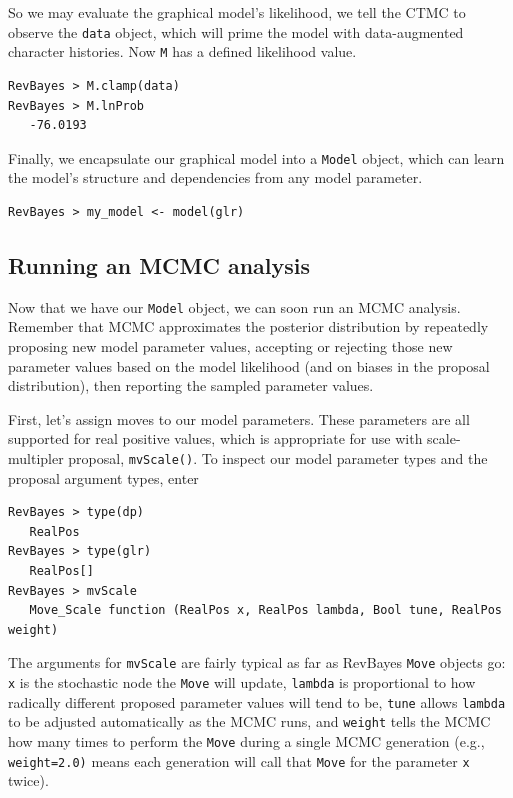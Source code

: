 \documentclass[11pt]{article}
\begin{document}
So we may evaluate the graphical model's likelihood, we tell the CTMC to observe the {\tt data} object, which will prime the model with data-augmented character histories.
Now {\tt M} has a defined likelihood value.
\begin{snugshade}
\begin{lstlisting}
RevBayes > M.clamp(data)
RevBayes > M.lnProb
   -76.0193
\end{lstlisting}
\end{snugshade}

Finally, we encapsulate our graphical model into a {\tt Model} object, which can learn the model's structure and dependencies from any model parameter.
\begin{snugshade}
\begin{lstlisting}
RevBayes > my_model <- model(glr)
\end{lstlisting}
\end{snugshade}

\subsection{Running an MCMC analysis}

Now that we have our {\tt Model} object, we can soon run an MCMC analysis.
Remember that MCMC approximates the posterior distribution by repeatedly proposing new model parameter values, accepting or rejecting those new parameter values based on the model likelihood (and on biases in the proposal distribution), then reporting the sampled parameter values.

First, let's assign moves to our model parameters.
These parameters are all supported for real positive values, which is appropriate for use with scale-multipler proposal, {\tt mvScale()}.
To inspect our model parameter types and the proposal argument types, enter

\begin{snugshade}
\begin{lstlisting}
RevBayes > type(dp)
   RealPos
RevBayes > type(glr)
   RealPos[]
RevBayes > mvScale
   Move_Scale function (RealPos x, RealPos lambda, Bool tune, RealPos weight)
\end{lstlisting}
\end{snugshade}

The arguments for {\tt mvScale} are fairly typical as far as RevBayes {\tt Move} objects go: {\tt x} is the stochastic node the {\tt Move} will update, {\tt lambda} is proportional to how radically different proposed parameter values will tend to be, {\tt tune} allows {\tt lambda} to be adjusted automatically as the MCMC runs, and {\tt weight} tells the MCMC how many times to perform the {\tt Move} during a single MCMC generation (e.g., {\tt weight=2.0)} means each generation will call that {\tt Move} for the parameter {\tt x} twice).
\end{document}
